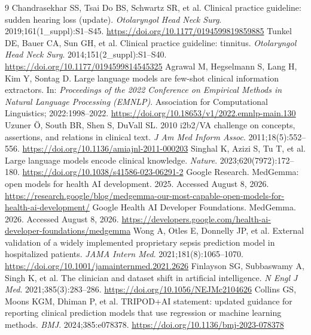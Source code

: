 \documentclass[11pt]{article}
\begin{document}
\begin{thebibliography}{9}
 Chandrasekhar SS, Tsai Do BS, Schwartz SR, et al. Clinical practice guideline: sudden hearing loss (update). \textit{Otolaryngol Head Neck Surg}. 2019;161(1\_suppl):S1--S45. \url{https://doi.org/10.1177/0194599819859885}
 Tunkel DE, Bauer CA, Sun GH, et al. Clinical practice guideline: tinnitus. \textit{Otolaryngol Head Neck Surg}. 2014;151(2\_suppl):S1--S40. \url{https://doi.org/10.1177/0194599814545325}
 Agrawal M, Hegselmann S, Lang H, Kim Y, Sontag D. Large language models are few-shot clinical information extractors. In: \textit{Proceedings of the 2022 Conference on Empirical Methods in Natural Language Processing (EMNLP)}. Association for Computational Linguistics; 2022:1998--2022. \url{https://doi.org/10.18653/v1/2022.emnlp-main.130}
 Uzuner \"{O}, South BR, Shen S, DuVall SL. 2010 i2b2/VA challenge on concepts, assertions, and relations in clinical text. \textit{J Am Med Inform Assoc}. 2011;18(5):552--556. \url{https://doi.org/10.1136/amiajnl-2011-000203}
 Singhal K, Azizi S, Tu T, et al. Large language models encode clinical knowledge. \textit{Nature}. 2023;620(7972):172--180. \url{https://doi.org/10.1038/s41586-023-06291-2}
 Google Research. MedGemma: open models for health AI development. 2025. Accessed August 8, 2026. \url{https://research.google/blog/medgemma-our-most-capable-open-models-for-health-ai-development/}
 Google Health AI Developer Foundations. MedGemma. 2026. Accessed August 8, 2026. \url{https://developers.google.com/health-ai-developer-foundations/medgemma}
 Wong A, Otles E, Donnelly JP, et al. External validation of a widely implemented proprietary sepsis prediction model in hospitalized patients. \textit{JAMA Intern Med}. 2021;181(8):1065--1070. \url{https://doi.org/10.1001/jamainternmed.2021.2626}
 Finlayson SG, Subbaswamy A, Singh K, et al. The clinician and dataset shift in artificial intelligence. \textit{N Engl J Med}. 2021;385(3):283--286. \url{https://doi.org/10.1056/NEJMc2104626}
 Collins GS, Moons KGM, Dhiman P, et al. TRIPOD+AI statement: updated guidance for reporting clinical prediction models that use regression or machine learning methods. \textit{BMJ}. 2024;385:e078378. \url{https://doi.org/10.1136/bmj-2023-078378}
\end{thebibliography}
\end{document}
